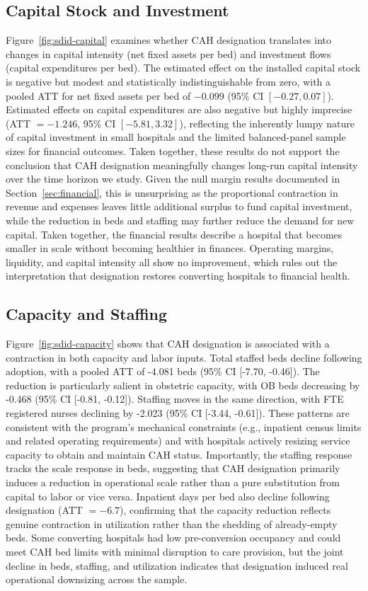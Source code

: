\documentclass[a4paper, 12pt, twoside]{article}
\begin{document}
\subsection{Capital Stock and Investment}
\label{sec:capital}
Figure~\ref{fig:sdid-capital} examines whether CAH designation translates into changes in capital intensity (net fixed assets per bed) and investment flows (capital expenditures per bed). The estimated effect on the installed capital stock is negative but modest and statistically indistinguishable from zero, with a pooled ATT for net fixed assets per bed of $-0.099$ (95\% CI $[-0.27, 0.07]$). Estimated effects on capital expenditures are also negative but highly imprecise (ATT $= -1.246$, 95\% CI $[-5.81, 3.32]$), reflecting the inherently lumpy nature of capital investment in small hospitals and the limited balanced-panel sample sizes for financial outcomes. Taken together, these results do not support the conclusion that CAH designation meaningfully changes long-run capital intensity over the time horizon we study. Given the null margin results documented in Section~\ref{sec:financial}, this is unsurprising as the proportional contraction in revenue and expenses leaves little additional surplus to fund capital investment, while the reduction in beds and staffing may further reduce the demand for new capital. Taken together, the financial results describe a hospital that becomes smaller in scale without becoming healthier in finances. Operating margins, liquidity, and capital intensity all show no improvement, which rules out the interpretation that designation restores converting hospitals to financial health.

\subsection{Capacity and Staffing}
\label{sec:capacity}
Figure~\ref{fig:sdid-capacity} shows that CAH designation is associated with a contraction in both capacity and labor inputs. Total staffed beds decline following adoption, with a pooled ATT of -4.081 beds (95\% CI [-7.70, -0.46]). The reduction is particularly salient in obstetric capacity, with OB beds decreasing by -0.468 (95\% CI [-0.81, -0.12]). Staffing moves in the same direction, with FTE registered nurses declining by -2.023 (95\% CI [-3.44, -0.61]). These patterns are consistent with the program's mechanical constraints (e.g., inpatient census limits and related operating requirements) and with hospitals actively resizing service capacity to obtain and maintain CAH status. Importantly, the staffing response tracks the scale response in beds, suggesting that CAH designation primarily induces a reduction in operational scale rather than a pure substitution from capital to labor or vice versa. Inpatient days per bed also decline following designation (ATT $= -6.7$), confirming that the capacity reduction reflects genuine contraction in utilization rather than the shedding of already-empty beds. Some converting hospitals had low pre-conversion occupancy and could meet CAH bed limits with minimal disruption to care provision, but the joint decline in beds, staffing, and utilization indicates that designation induced real operational downsizing across the sample.
\end{document}
